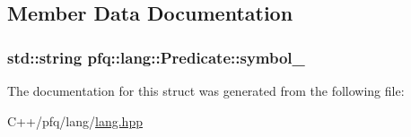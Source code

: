 \subsection{Member Data Documentation}
\hypertarget{structpfq_1_1lang_1_1Predicate_af3caf778e1fba3f768925816405cdfce}{
\subsubsection[{symbol\+\_\+}]{\setlength{\rightskip}{0pt plus 5cm}std\+::string pfq\+::lang\+::\+Predicate\+::symbol\+\_\+}}\label{structpfq_1_1lang_1_1Predicate_af3caf778e1fba3f768925816405cdfce}


The documentation for this struct was generated from the following file\+:\begin{DoxyCompactItemize}
\item 
C++/pfq/lang/\hyperlink{lang_8hpp}{lang.\+hpp}\end{DoxyCompactItemize}
